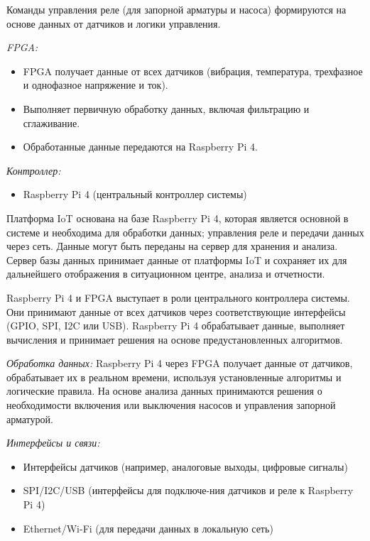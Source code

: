 \begin{multicols}{2}
Команды управления реле (для запорной арматуры и насоса) формируются на
основе данных от датчиков и логики управления.

\emph{FPGA:}

\begin{itemize}
  \setlength{\itemindent}{1cm}

\item
  FPGA получает данные от всех датчиков (вибрация, температура,
  трехфазное и однофазное напряжение и ток).
\item
  Выполняет первичную обработку данных, включая фильтрацию и
  сглаживание.
\item
  Обработанные данные передаются на Raspberry Pi 4.
\end{itemize}

\emph{Контроллер:}

\begin{itemize}
  \setlength{\itemindent}{1cm}

\item
  Raspberry Pi 4 (центральный контроллер системы)
\end{itemize}

Платформа IoT основана на базе Raspberry Pi 4, которая является основной
в системе и необходима для обработки данных; управления реле и передачи
данных через сеть. Данные могут быть переданы на сервер для хранения и
анализа. Сервер базы данных принимает данные от платформы IoT и
сохраняет их для дальнейшего отображения в ситуационном центре, анализа
и отчетности.

Raspberry Pi 4 и FPGA выступает в роли центрального контроллера системы.
Они принимают данные от всех датчиков через соответствующие интерфейсы
(GPIO, SPI, I2C или USB). Raspberry Pi 4 обрабатывает данные, выполняет
вычисления и принимает решения на основе предустановленных алгоритмов.

\emph{Обработка данных:} Raspberry Pi 4 через FPGA получает данные от
датчиков, обрабатывает их в реальном времени, используя установленные
алгоритмы и логические правила. На основе анализа данных принимаются
решения о необходимости включения или выключения насосов и управления
запорной арматурой.

\emph{Интерфейсы и связи:}

\begin{itemize}
  \setlength{\itemindent}{1cm}

\item
  Интерфейсы датчиков (например, аналоговые выходы, цифровые сигналы)
\item
  SPI/I2C/USB (интерфейсы для подключе-ния датчиков и реле к Raspberry Pi
  4)
\item
  Ethernet/Wi-Fi (для передачи данных в локальную сеть)
\end{itemize}


\end{multicols}
